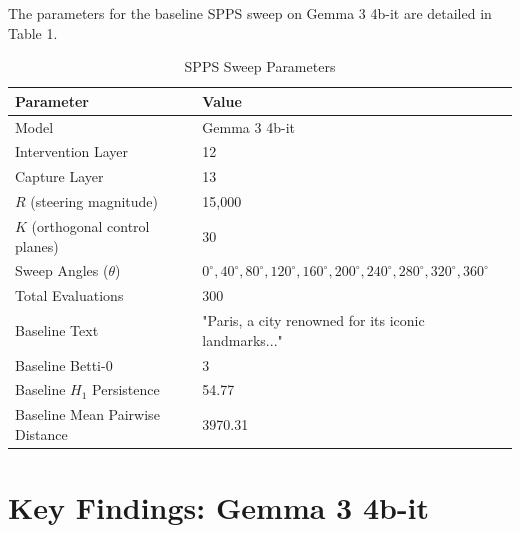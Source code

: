 \documentclass[11pt,a4paper,oneside]{memoir}
\begin{document}
The parameters for the baseline SPPS sweep on Gemma 3 4b-it are detailed in Table 1.

\begin{table}[htbp]
\centering
\caption{SPPS Sweep Parameters}
\label{tab:sweep_parameters}
\begin{tabular}{ll}
\toprule
\textbf{Parameter} & \textbf{Value} \\
\midrule
Model & Gemma 3 4b-it \\
Intervention Layer & 12 \\
Capture Layer & 13 \\
$R$ (steering magnitude) & 15,000 \\
$K$ (orthogonal control planes) & 30 \\
Sweep Angles ($\theta$) & $0^{\circ}, 40^{\circ}, 80^{\circ}, 120^{\circ}, 160^{\circ}, 200^{\circ}, 240^{\circ}, 280^{\circ}, 320^{\circ}, 360^{\circ}$ \\
Total Evaluations & 300 \\
Baseline Text & "Paris, a city renowned for its iconic landmarks..." \\
Baseline Betti-0 & 3 \\
Baseline $H_1$ Persistence & 54.77 \\
Baseline Mean Pairwise Distance & 3970.31 \\
\bottomrule
\end{tabular}
\end{table}

\chapter{Key Findings: Gemma 3 4b-it}
\label{sec:findings_gemma3}
\end{document}
